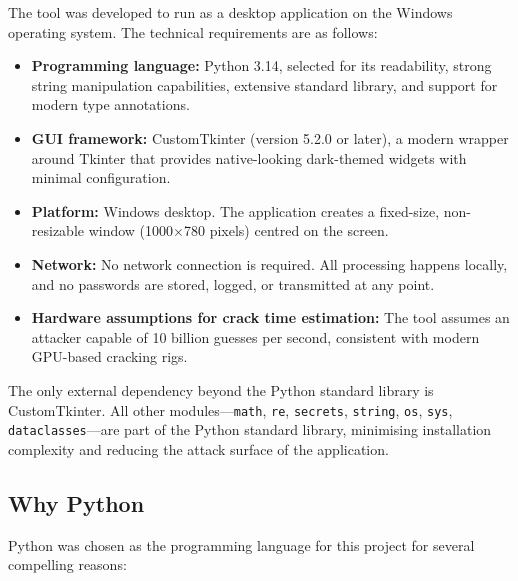 The tool was developed to run as a desktop application on the Windows operating system. The technical requirements are as follows:

\begin{itemize}
    \item \textbf{Programming language:} Python 3.14, selected for its readability, strong string manipulation capabilities, extensive standard library, and support for modern type annotations.
    \item \textbf{GUI framework:} CustomTkinter (version 5.2.0 or later), a modern wrapper around Tkinter that provides native-looking dark-themed widgets with minimal configuration.
    \item \textbf{Platform:} Windows desktop. The application creates a fixed-size, non-resizable window (1000$\times$780 pixels) centred on the screen.
    \item \textbf{Network:} No network connection is required. All processing happens locally, and no passwords are stored, logged, or transmitted at any point.
    \item \textbf{Hardware assumptions for crack time estimation:} The tool assumes an attacker capable of 10 billion guesses per second, consistent with modern GPU-based cracking rigs.
\end{itemize}

The only external dependency beyond the Python standard library is CustomTkinter. All other modules---\texttt{math}, \texttt{re}, \texttt{secrets}, \texttt{string}, \texttt{os}, \texttt{sys}, \texttt{dataclasses}---are part of the Python standard library, minimising installation complexity and reducing the attack surface of the application.

\subsection{Why Python}

Python was chosen as the programming language for this project for several compelling reasons:

